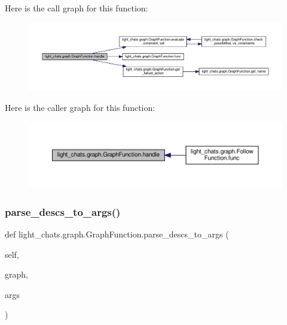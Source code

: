 Here is the call graph for this function\+:
\nopagebreak
\begin{figure}[H]
\begin{center}
\leavevmode
\includegraphics[width=350pt]{classlight__chats_1_1graph_1_1GraphFunction_a21e2dd1c8eb431b3ee22cce4853e3c15_cgraph}
\end{center}
\end{figure}
Here is the caller graph for this function\+:
\nopagebreak
\begin{figure}[H]
\begin{center}
\leavevmode
\includegraphics[width=350pt]{classlight__chats_1_1graph_1_1GraphFunction_a21e2dd1c8eb431b3ee22cce4853e3c15_icgraph}
\end{center}
\end{figure}
\mbox{\label{classlight__chats_1_1graph_1_1GraphFunction_a8b76e8a8bb07f75abd081e220683dbd4}} 
\subsubsection{\texorpdfstring{parse\+\_\+descs\+\_\+to\+\_\+args()}{parse\_descs\_to\_args()}}
{\footnotesize\ttfamily def light\+\_\+chats.\+graph.\+Graph\+Function.\+parse\+\_\+descs\+\_\+to\+\_\+args (\begin{DoxyParamCaption}\item[{}]{self,  }\item[{}]{graph,  }\item[{}]{args }\end{DoxyParamCaption})}

